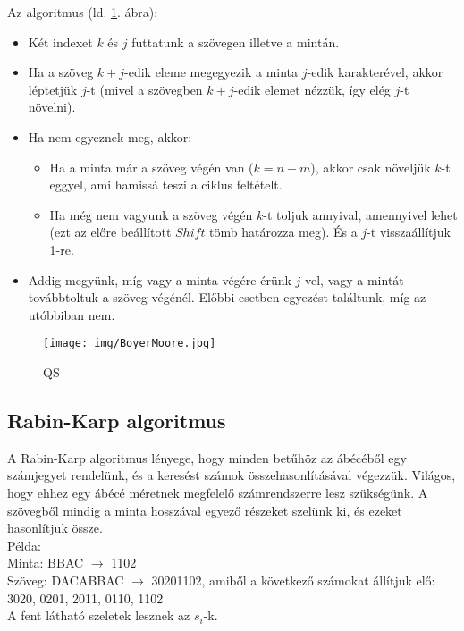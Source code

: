 \documentclass[margin=0px]{article}
\begin{document}
			Az algoritmus (ld. \ref{fig:BoyerMoore}. ábra):
			\begin{itemize}
				\item Két indexet $k$ és $j$ futtatunk a szövegen illetve a mintán.
				\item Ha a szöveg $k+j$-edik eleme megegyezik a minta $j$-edik karakterével, akkor léptetjük $j$-t (mivel a szövegben $k+j$-edik elemet nézzük, így elég $j$-t növelni).
				\item Ha nem egyeznek meg, akkor:
				\begin{itemize}
					\item Ha a minta már a szöveg végén van ($k=n-m$), akkor csak növeljük $k$-t eggyel, ami hamissá teszi a ciklus feltételt.
					\item Ha még nem vagyunk a szöveg végén $k$-t toljuk annyival, amennyivel lehet (ezt az előre beállított $Shift$ tömb határozza meg). És a $j$-t visszaállítjuk 1-re.
				\end{itemize}
				\item Addig megyünk, míg vagy a minta végére érünk $j$-vel, vagy a mintát továbbtoltuk a szöveg végénél. Előbbi esetben egyezést találtunk, míg az utóbbiban nem.
			\end{itemize}
			
			\begin{figure}[H]
				\centering
				\texttt{[image: img/BoyerMoore.jpg]}
				\caption{QS}
				\label{fig:BoyerMoore}
			\end{figure}
		\subsection{Rabin-Karp algoritmus}
			A Rabin-Karp algoritmus lényege, hogy minden betűhöz az ábécéből egy számjegyet rendelünk, és a keresést számok összehasonlításával végezzük. Világos, hogy ehhez egy ábécé méretnek megfelelő számrendszerre lesz szükségünk. A szövegből mindig a minta hosszával egyező részeket szelünk ki, és ezeket hasonlítjuk össze.\\
			
			\noindent
			Példa:\\
				Minta: BBAC $\rightarrow$ 1102 \\
				Szöveg: DACABBAC $\rightarrow$ 30201102, amiből a következő számokat állítjuk elő: 3020, 0201, 2011, 0110, 1102\\
			
			\noindent
			A fent látható szeletek lesznek az $s_i$-k.\\
			
\end{document}
